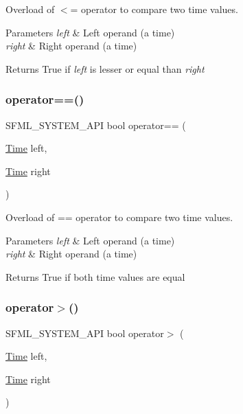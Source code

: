 Overload of $<$= operator to compare two time values. 


\begin{DoxyParams}{Parameters}
{\em left} & Left operand (a time) \\
\hline
{\em right} & Right operand (a time)\\
\hline
\end{DoxyParams}
\begin{DoxyReturn}{Returns}
True if {\itshape left} is lesser or equal than {\itshape right} 
\end{DoxyReturn}
\mbox{\label{classsf_1_1_time_a2b8453227f651e9d5db3663fa08c47e2}} 
\subsubsection{\texorpdfstring{operator==()}{operator==()}}
{\footnotesize\ttfamily S\+F\+M\+L\+\_\+\+S\+Y\+S\+T\+E\+M\+\_\+\+A\+PI bool operator== (\begin{DoxyParamCaption}\item[{\hyperlink{classsf_1_1_time}{Time}}]{left,  }\item[{\hyperlink{classsf_1_1_time}{Time}}]{right }\end{DoxyParamCaption})\hspace{0.3cm}{\ttfamily [related]}}



Overload of == operator to compare two time values. 


\begin{DoxyParams}{Parameters}
{\em left} & Left operand (a time) \\
\hline
{\em right} & Right operand (a time)\\
\hline
\end{DoxyParams}
\begin{DoxyReturn}{Returns}
True if both time values are equal 
\end{DoxyReturn}
\mbox{\label{classsf_1_1_time_a23978402846bf3c7ac54a3f2c6b397a2}} 
\subsubsection{\texorpdfstring{operator$>$()}{operator>()}}
{\footnotesize\ttfamily S\+F\+M\+L\+\_\+\+S\+Y\+S\+T\+E\+M\+\_\+\+A\+PI bool operator$>$ (\begin{DoxyParamCaption}\item[{\hyperlink{classsf_1_1_time}{Time}}]{left,  }\item[{\hyperlink{classsf_1_1_time}{Time}}]{right }\end{DoxyParamCaption})\hspace{0.3cm}{\ttfamily [related]}}



